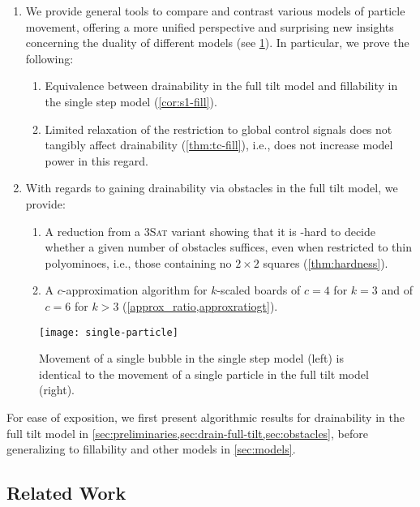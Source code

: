 \documentclass[a4paper,UKenglish,cleveref,thm-restate]{lipics-v2021}
\begin{document}
\begin{enumerate}[(1)]
\item We provide general tools to compare and contrast various models of
  particle movement, offering a more unified perspective and surprising new insights concerning the duality of different models (see \cref{fig:single-particle}). In particular, we prove the following:
  \begin{enumerate}[(1.1)]
	\item Equivalence between drainability in the full tilt model and fillability in the single step model (\cref{cor:s1-fill}).
	\item Limited relaxation of the restriction to global control signals does not tangibly affect drainability (\cref{thm:tc-fill}), i.e., does not increase model power in this regard.
  \end{enumerate}
\item With regards to gaining drainability via obstacles in the full tilt model, we provide:
	\begin{enumerate}[(2.1)]
		\item A reduction from a \textsc{3Sat} variant showing that it is \NP-hard to decide whether a given number of obstacles suffices, even when restricted to thin polyominoes, i.e., those containing no $2 \times 2$ squares (\cref{thm:hardness}).
		\item A $c$-approximation algorithm for $k$-scaled boards of $c=4$ for $k=3$ and of $c=6$ for $k>3$ (\cref{approx_ratio,approxratiogt}).
	\end{enumerate}
\end{enumerate}

\begin{figure}[htb]
\centering
\texttt{[image: single-particle]}\caption{Movement of a single bubble in the single step model (left) is identical
  to the movement of a single particle in the full tilt model
  (right).}\label{fig:single-particle}
\end{figure}

For ease of exposition, we first present algorithmic results for
drainability in the full tilt model in
\cref{sec:preliminaries,sec:drain-full-tilt,sec:obstacles}, before generalizing
to fillability and other models in \cref{sec:models}.

\subsection{Related Work}
\label{subsec:relatedwork}
\end{document}
